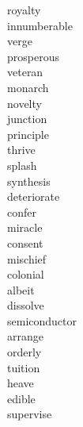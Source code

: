 \documentclass[a4paper, 10pt]{ctexart}
\begin{document}
\begin{multicols*}{2}
\begin{description}
\item[royalty]

\item[innumberable]

\item[verge]

\item[prosperous]

\item[veteran]

\item[monarch]

\item[novelty]

\item[junction]

\item[principle]

\item[thrive]

\item[splash]

\item[synthesis]

\item[deteriorate]

\item[confer]

\item[miracle]

\item[consent]

\item[mischief]

\item[colonial]

\item[albeit]

\item[dissolve]

\item[semiconductor]

\item[arrange]

\item[orderly]

\item[tuition]

\item[heave]

\item[edible]

\item[supervise]


\end{description}
\end{multicols*}
\end{document}
